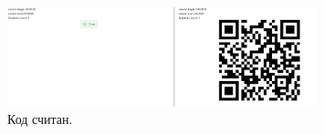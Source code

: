 \begin{figure}[ht]
    \centering
    \includegraphics[width=0.8\textwidth]{../resources/done.PNG}
    \caption{Код считан.}
\end{figure}